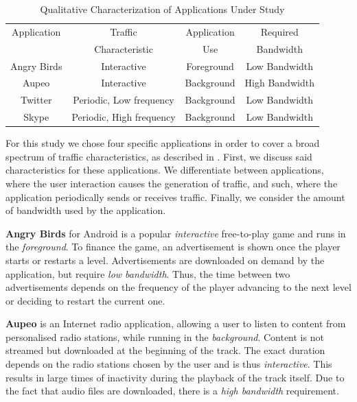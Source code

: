 \begin{table}
  \centering
  \begin{tabular}{cccc}
  	\bottomrule
    Application&Traffic&Application&Required\\
    &Characteristic&Use&Bandwidth\\
    \midrule
    Angry Birds & Interactive & Foreground & Low Bandwidth \\
    Aupeo & Interactive & Background & High Bandwidth\\
    Twitter & Periodic, Low frequency & Background & Low Bandwidth\\
    Skype & Periodic, High frequency& Background & Low Bandwidth\\
    \bottomrule
  \end{tabular}
  \caption{Qualitative Characterization of Applications Under Study}
  \label{tab:network:network_traces:numerical_results:app_characterization}
\end{table}

For this study we chose four specific applications in order to cover a broad spectrum of traffic characteristics, as described in .
First, we discuss said characteristics for these applications.
We differentiate between applications, where the user interaction causes the generation of traffic, and such, where the application periodically sends or receives traffic.
Finally, we consider the amount of bandwidth used by the application.

\textbf{Angry Birds} for Android is a popular \emph{interactive} free-to-play game and runs in the \emph{foreground}.
To finance the game, an advertisement is shown once the player starts or restarts a level.
Advertisements are downloaded on demand by the application, but require \emph{low bandwidth}.
Thus, the time between two advertisements depends on the frequency of the player advancing to the next level or deciding to restart the current one.

\textbf{Aupeo} is an Internet radio application, allowing a user to listen to content from personalised radio stations, while running in the \emph{background}.
Content is not streamed but downloaded at the beginning of the track.
The exact duration depends on the radio stations chosen by the user and is thus \emph{interactive}.
This results in large times of inactivity during the playback of the track itself.
Due to the fact that audio files are downloaded, there is a \emph{high bandwidth} requirement.

